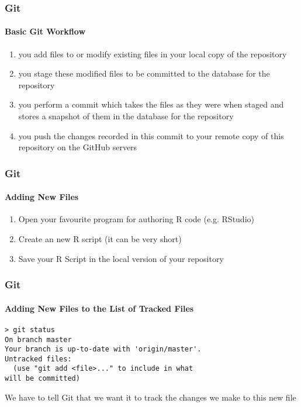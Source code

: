 \documentclass[xcolor=dvipsnames]{beamer}
\begin{document}
\begin{frame} 
\frametitle{Git}
\framesubtitle{Basic Git Workflow}
\begin{enumerate}
\item you add files to or modify existing files in your local copy of the repository
\newline
\item you stage these modified files to be committed to the database for the repository
\newline
\item you perform a commit which takes the files as they were when staged and stores a snapshot of them in the database for the repository
\newline
\item you push the changes recorded in this commit to your remote copy of this repository on the GitHub servers
\end{enumerate}
\end{frame}

\begin{frame}[fragile]
\frametitle{Git}
\framesubtitle{Adding New Files}
\begin{enumerate}
\item Open your favourite program for authoring R code (e.g. RStudio)
\newline
\item Create an new R script (it can be very short) 
\newline
\item Save your R Script in the local version of your repository
\end{enumerate}

\end{frame}

\begin{frame}[fragile]
\frametitle{Git}
\framesubtitle{Adding New Files to the List of Tracked Files}

\begin{block}{}
\begin{lstlisting}
> git status
On branch master
Your branch is up-to-date with 'origin/master'.
Untracked files:
  (use "git add <file>..." to include in what 
will be committed)
\end{lstlisting}
\end{block}

We have to tell Git that we want it to track the changes we make to this new file

\end{frame}
\end{document}
